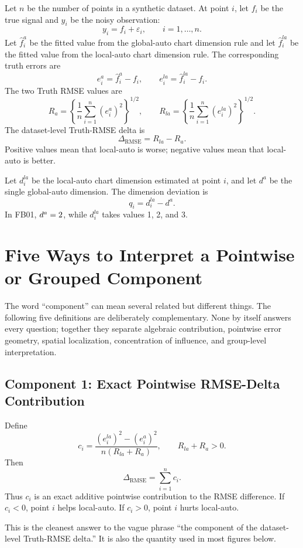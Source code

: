 \documentclass[11pt]{article}
\begin{document}
Let \(n\) be the number of points in a synthetic dataset.  At point \(i\), let
\(f_i\) be the true signal and \(y_i\) be the noisy observation:
\[
  y_i = f_i + \varepsilon_i,
  \qquad i=1,\ldots,n.
\]
Let \(\widehat f_i^{a}\) be the fitted value from the global-auto chart
dimension rule and let \(\widehat f_i^{la}\) be the fitted value from the
local-auto chart dimension rule.  The corresponding truth errors are
\[
  e_i^{a} = \widehat f_i^{a} - f_i,
  \qquad
  e_i^{la} = \widehat f_i^{la} - f_i.
\]
The two Truth RMSE values are
\[
  R_a =
  \left\{
    \frac{1}{n}
    \sum_{i=1}^{n}
    (e_i^a)^2
  \right\}^{1/2},
  \qquad
  R_{la} =
  \left\{
    \frac{1}{n}
    \sum_{i=1}^{n}
    (e_i^{la})^2
  \right\}^{1/2}.
\]
The dataset-level Truth-RMSE delta is
\[
  \Delta_{\mathrm{RMSE}}
  =
  R_{la} - R_a.
\]
Positive values mean that local-auto is worse; negative values mean that
local-auto is better.

Let \(d_i^{la}\) be the local-auto chart dimension estimated at point \(i\), and
let \(d^a\) be the single global-auto dimension.  The dimension deviation is
\[
  q_i = d_i^{la} - d^a.
\]
In FB01, \(d^a=2\), while \(d_i^{la}\) takes values 1, 2, and 3.

\section{Five Ways to Interpret a Pointwise or Grouped Component}

The word ``component'' can mean several related but different things.  The
following five definitions are deliberately complementary.  None by itself
answers every question; together they separate algebraic contribution,
pointwise error geometry, spatial localization, concentration of influence, and
group-level interpretation.

\subsection{Component 1: Exact Pointwise RMSE-Delta Contribution}

Define
\[
  c_i
  =
  \frac{
    (e_i^{la})^2 - (e_i^a)^2
  }{
    n(R_{la}+R_a)
  },
  \qquad R_{la}+R_a>0.
\]
Then
\[
  \Delta_{\mathrm{RMSE}}
  =
  \sum_{i=1}^{n} c_i.
\]
Thus \(c_i\) is an exact additive pointwise contribution to the RMSE
difference.  If \(c_i<0\), point \(i\) helps local-auto.  If \(c_i>0\), point
\(i\) hurts local-auto.

This is the cleanest answer to the vague phrase ``the component of the
dataset-level Truth-RMSE delta.''  It is also the quantity used in most figures
below.
\end{document}
